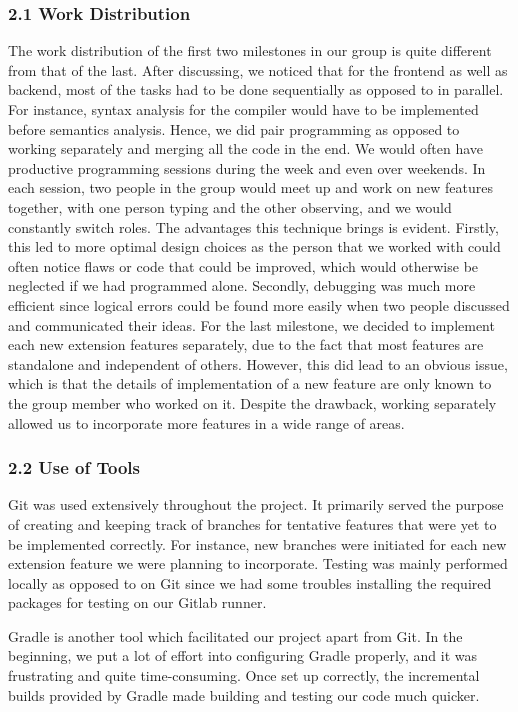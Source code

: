 \documentclass[10pt,a4paper]{report}
\begin{document}
  \subsubsection*{2.1 Work Distribution}
  The work distribution of the first two milestones in our group is quite
  different from that of the last. After discussing, we noticed that for the
  frontend as well as backend, most of the tasks had to be done sequentially as
  opposed to in parallel. For instance, syntax analysis for the compiler would
  have to be implemented before semantics analysis. Hence, we did pair
  programming as opposed to working separately and merging all the code in the
  end. We would often have productive programming sessions during the week and
  even over weekends. In each session, two people in the group would meet up and
  work on new features together, with one person typing and the other observing,
  and we would constantly switch roles. The advantages this technique brings is
  evident. Firstly, this led to more optimal design choices as the person that
  we worked with could often notice flaws or code that could be improved, which
  would otherwise be neglected if we had programmed alone. Secondly, debugging
  was much more efficient since logical errors could be found more easily when
  two people discussed and communicated their ideas.
  For the last milestone, we decided to implement each new extension features
  separately, due to the fact that most features are standalone and independent
  of others. However, this did lead to an obvious issue, which is that the
  details of implementation of a new feature are only known to the group member
  who worked on it. Despite the drawback, working separately allowed us to
  incorporate more features in a wide range of areas.

  \subsubsection*{2.2 Use of Tools}
  Git was used extensively throughout the project. It primarily served the
  purpose of creating and keeping track of branches for tentative features that
  were yet to be implemented correctly. For instance, new branches were
  initiated for each new extension feature we were planning to incorporate.
  Testing was mainly performed locally as opposed to on Git since we had some
  troubles installing the required packages for testing on our Gitlab runner.

  Gradle is another tool which facilitated our project apart from Git. In the
  beginning, we put a lot of effort into configuring Gradle properly, and it was
  frustrating and quite time-consuming. Once set up correctly, the incremental
  builds provided by Gradle made building and testing our code much quicker.
\end{document}

